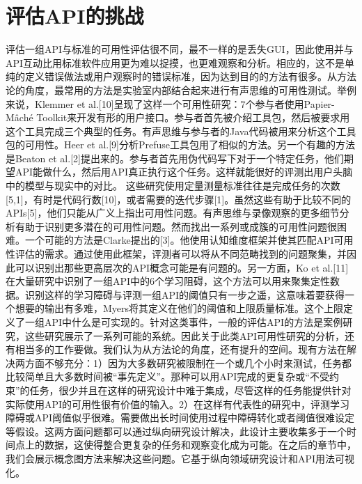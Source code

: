\section*{评估API的挑战}
评估一组API与标准的可用性评估很不同，最不一样的是丢失GUI，因此使用并与API互动比用标准软件应用更为难以捉摸，也更难观察和分析。相应的，这不是单纯的定义错误做法或用户观察时的错误标准，因为达到目的的方法有很多。从方法论的角度，最常用的方法是实验室内部结合起来进行有声思维的可用性测试。举例来说，Klemmer et al.[10]呈现了这样一个可用性研究：7个参与者使用Papier-Mâché Toolkit来开发有形的用户接口。参与者首先被介绍工具包，然后被要求用这个工具完成三个典型的任务。有声思维与参与者的Java代码被用来分析这个工具包的可用性。Heer et al.[9]分析Prefuse工具包用了相似的方法。另一个有趣的方法是Beaton et al.[2]提出来的。参与者首先用伪代码写下对于一个特定任务，他们期望API能做什么，然后用API真正执行这个任务。这样就能很好的评测出用户头脑中的模型与现实中的对比。
这些研究使用定量测量标准往往是完成任务的次数[5,1]，有时是代码行数[10]，或者需要的迭代步骤[1]。虽然这些有助于比较不同的APIs[5]，他们只能从广义上指出可用性问题。有声思维与录像观察的更多细节分析有助于识别更多潜在的可用性问题。然而找出一系列或成簇的可用性问题很困难。一个可能的方法是Clarke提出的[3]。他使用认知维度框架并使其匹配API可用性评估的需求。通过使用此框架，评测者可以将从不同范畴找到的问题聚集，并因此可以识别出那些更高层次的API概念可能是有问题的。另一方面，Ko et al.[11]在大量研究中识别了一组API中的6个学习阻碍，这个方法可以用来聚集定性数据。识别这样的学习障碍与评测一组API的阈值只有一步之遥，这意味着要获得一个想要的输出有多难，Myers将其定义在他们的阈值和上限质量标准。这个上限定义了一组API中什么是可实现的。针对这类事件，一般的评估API的方法是案例研究，这些研究展示了一系列可能的系统。因此关于此类API可用性研究的分析，还有相当多的工作要做。我们认为从方法论的角度，还有提升的空间。现有方法在解决两方面不够充分：1）因为大多数研究被限制在一个或几个小时来测试，任务都比较简单且大多数时间被“事先定义”。那种可以用API完成的更复杂或“不受约束”的任务，很少并且在这样的研究设计中难于集成，尽管这样的任务能提供针对实际使用API的可用性很有价值的输入。2）在这样有代表性的研究中，评测学习障碍或API阈值似乎很难。需要做出长时间使用过程中障碍转化或者阈值很难设定等假设。这两方面问题都可以通过纵向研究设计解决，此设计主要收集多于一个时间点上的数据，这使得整合更复杂的任务和观察变化成为可能。在之后的章节中，我们会展示概念图方法来解决这些问题。它基于纵向领域研究设计和API用法可视化。
